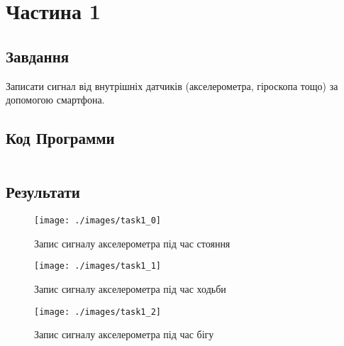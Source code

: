 \section{Частина 1}
\label{sec:task1}

\subsection{Завдання}
\label{subsec:task1_task}

Записати сигнал від внутрішніх датчиків
(акселерометра, гіроскопа тощо) за допомогою смартфона.

\subsection{Код Программи}
\label{subsec:task1_code}
\inputminted{python}{../src/task1.py}

\subsection{Результати}
\label{subsec:task1_results}

\begin{figure}[!ht]
    \centering
    \texttt{[image: ./images/task1\_0]}
    \caption{Запис сигналу акселерометра під час стояння}
    \label{fig:steady}
\end{figure}

\begin{figure}[!ht]
    \centering
    \texttt{[image: ./images/task1\_1]}
    \caption{Запис сигналу акселерометра під час ходьби}
    \label{fig:walking}
\end{figure}

\begin{figure}[!ht]
    \centering
    \texttt{[image: ./images/task1\_2]}
    \caption{Запис сигналу акселерометра під час бігу}
    \label{fig:running}
\end{figure}
